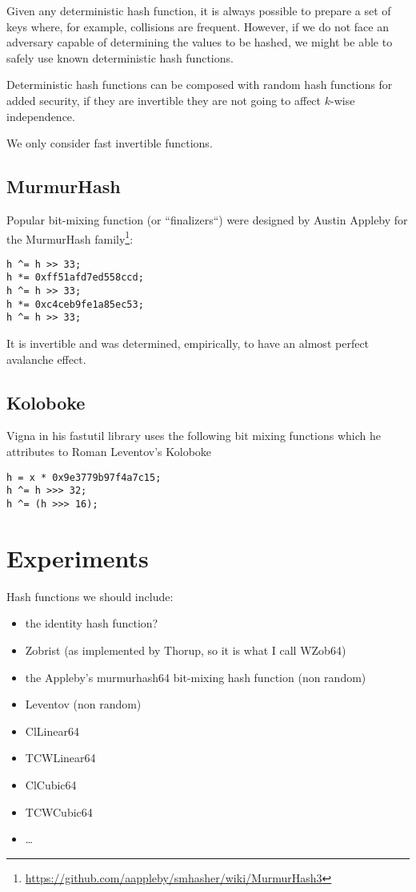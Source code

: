 \documentclass{article}
\begin{document}
Given any deterministic hash function, it is always possible to prepare a set of keys where, for example, collisions are frequent. However, if we do not face an adversary capable of determining the values to be hashed, we might be able to  safely use known deterministic hash functions. 

Deterministic hash functions can be composed with random hash functions for added security, if they are invertible they are not going to affect $k$-wise independence.


We only consider fast invertible functions.

\subsection{MurmurHash}

Popular bit-mixing function (or ``finalizers``) were designed by Austin	Appleby for the MurmurHash family\footnote{\url{https://github.com/aappleby/smhasher/wiki/MurmurHash3}}:


\begin{lstlisting}
h ^= h >> 33;
h *= 0xff51afd7ed558ccd;
h ^= h >> 33;
h *= 0xc4ceb9fe1a85ec53;
h ^= h >> 33;
\end{lstlisting}

It is invertible and was determined, empirically, to have an almost perfect avalanche effect.

\subsection{Koloboke}

Vigna in his fastutil library uses the following bit mixing functions which he attributes to  Roman Leventov's Koloboke


\begin{lstlisting}
h = x * 0x9e3779b97f4a7c15;
h ^= h >>> 32;
h ^= (h >>> 16);
\end{lstlisting}


\section{Experiments}



Hash functions we should include:
\begin{itemize}
\item the identity hash function? 
\item Zobrist (as implemented by Thorup, so it is what I call WZob64)
\item  the Appleby's murmurhash64 bit-mixing hash function (non random)
\item Leventov (non random)
\item ClLinear64
\item TCWLinear64
\item ClCubic64
\item TCWCubic64~\cite{Thorup:2004:TBH:982792.982884}
\item \ldots 
\end{itemize}
\end{document}
